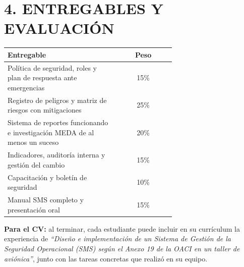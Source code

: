 \section*{4. ENTREGABLES Y EVALUACIÓN}
\begin{center}
\small
\begin{tabular}{|p{0.66\linewidth}|c|}
\hline
\textbf{Entregable} & \textbf{Peso} \\ \hline
Política de seguridad, roles y plan de respuesta ante emergencias & 15\% \\ \hline
Registro de peligros y matriz de riesgos con mitigaciones & 25\% \\ \hline
Sistema de reportes funcionando e investigación MEDA de al menos un suceso & 20\% \\ \hline
Indicadores, auditoría interna y gestión del cambio & 15\% \\ \hline
Capacitación y boletín de seguridad & 10\% \\ \hline
Manual SMS completo y presentación oral & 15\% \\ \hline
\end{tabular}
\end{center}

\begin{recuadro}
\textbf{Para el CV:} al terminar, cada estudiante puede incluir en su currículum la experiencia
de \textit{``Diseño e implementación de un Sistema de Gestión de la Seguridad Operacional (SMS)
según el Anexo 19 de la OACI en un taller de aviónica''}, junto con las tareas concretas que
realizó en su equipo.
\end{recuadro}
